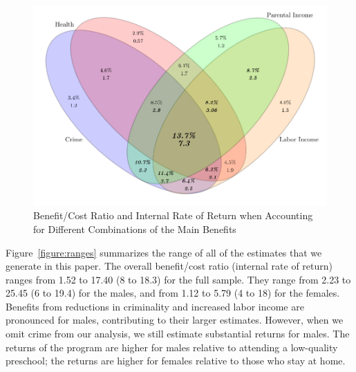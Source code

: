 \begin{figure}[!htbp]
\caption{Benefit/Cost Ratio and Internal Rate of Return when Accounting for Different Combinations of the Main Benefits}\label{figure:vennpooled}
\centering
\includegraphics[width=.7\columnwidth]{output/venn_pooled.pdf}
\end{figure}

Figure~\ref{figure:ranges} summarizes the range of all of the estimates that we generate in this paper. The overall benefit/cost ratio (internal rate of return) ranges from 1.52 to 17.40 (8 to 18.3) for the full sample. They range from 2.23 to 25.45 (6 to 19.4) for the males, and from 1.12 to 5.79 (4 to 18) for the females. Benefits from reductions in criminality and increased labor income are pronounced for males, contributing to their larger estimates. However, when we omit crime from our analysis, we still estimate substantial returns for males. The returns of the program are higher for males relative to attending a low-quality preschool; the returns are higher for females relative to those who stay at home.

